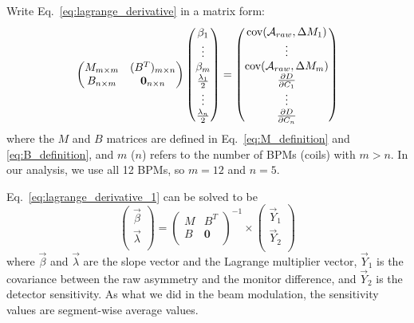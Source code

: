 Write Eq.~\ref{eq:lagrange_derivative} in a matrix form:
\begin{equation}
    \begin{pmatrix}
	M_{m\times m}	& (B^T)_{m\times n}	\\
	B_{n \times m}  & \bm{0}_{n\times n}   \\
    \end{pmatrix}
    \begin{pmatrix}
	\beta_1	\\
	\vdots	\\
	\beta_m	\\
	\frac{\lambda_1}{2} \\
	\vdots	\\
	\frac{\lambda_n}{2} \\
    \end{pmatrix}
    =
    \begin{pmatrix}
	\text{cov}(\mathcal{A}_{raw}, \Delta M_1)  \\
	\vdots	\\
	\text{cov}(\mathcal{A}_{raw}, \Delta M_m)  \\
	\frac{\partial D}{\partial C_1}	\\
	\vdots	\\
	\frac{\partial D}{\partial C_n}	\\
    \end{pmatrix}
    \label{eq:lagrange_derivative_1}
\end{equation}
where the $M$ and $B$ matrices are defined in Eq.~\ref{eq:M_definition} and \ref{eq:B_definition},
and $m$ ($n$) refers to the number of BPMs (coils) with $m > n$.
In our analysis, we use all 12 BPMs, so $m = 12$ and $n = 5$.

Eq.~\ref{eq:lagrange_derivative_1} can be solved to be
\begin{equation}
    \begin{pmatrix}
	\vec{\beta} \\
	\vec{\lambda}	\\
    \end{pmatrix}
    =
    \begin{pmatrix}
	M   & B^T   \\
	B   & \bm{0}	\\
    \end{pmatrix}^{-1}
    \times
    \begin{pmatrix}
	\vec{Y}_1   \\
	\vec{Y}_2   \\
    \end{pmatrix}
\end{equation}
where $\vec{\beta}$ and $\vec{\lambda}$ are the slope vector and the Lagrange multiplier vector,
$\vec{Y}_1$ is the covariance between the raw asymmetry and the monitor difference, 
and $\vec{Y}_2$ is the detector sensitivity. As what we did in the beam modulation, 
the sensitivity values are segment-wise average values.

